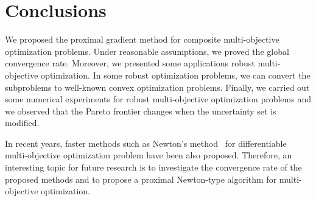 \documentclass[../main]{subfiles}
\begin{document}
\section{Conclusions} \label{sec:pgm:conclusions}
We proposed the proximal gradient method for composite multi-objective optimization problems.
Under reasonable assumptions, we proved the global convergence rate.
Moreover, we presented some applications robust multi-objective optimization.
In some robust optimization problems, we can convert the subproblems to well-known convex optimization problems.
Finally, we carried out some numerical experiments for robust multi-objective optimization problems and we observed that the Pareto frontier changes when the uncertainty set is modified.

In recent years, faster methods such as Newton's method~\cite{Fliege2009} for differentiable multi-objective optimization problem have been also proposed.
Therefore, an interesting topic for future research is to investigate the convergence rate of the proposed methods and to propose a proximal Newton-type algorithm for multi-objective optimization. 
\end{document}
